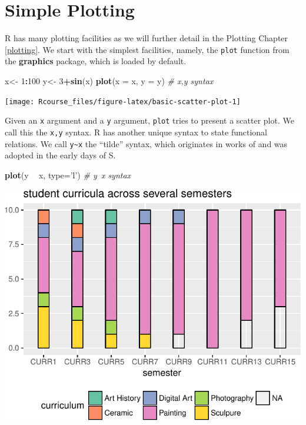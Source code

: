 \documentclass[]{book}
\newenvironment{Shaded}{\begin{snugshade}}{\end{snugshade}}
\newcommand{\KeywordTok}[1]{\textcolor[rgb]{0.13,0.29,0.53}{\textbf{#1}}}
\newcommand{\DataTypeTok}[1]{\textcolor[rgb]{0.13,0.29,0.53}{#1}}
\newcommand{\DecValTok}[1]{\textcolor[rgb]{0.00,0.00,0.81}{#1}}
\newcommand{\StringTok}[1]{\textcolor[rgb]{0.31,0.60,0.02}{#1}}
\newcommand{\CommentTok}[1]{\textcolor[rgb]{0.56,0.35,0.01}{\textit{#1}}}
\newcommand{\OperatorTok}[1]{\textcolor[rgb]{0.81,0.36,0.00}{\textbf{#1}}}
\newcommand{\NormalTok}[1]{#1}
\theoremstyle{definition}
\theoremstyle{definition}
\theoremstyle{definition}
\theoremstyle{remark}
\begin{document}
\section{Simple Plotting}\label{simple-plotting}

R has many plotting facilities as we will further detail in the Plotting
Chapter \ref{plotting}. We start with the simplest facilities, namely,
the \texttt{plot} function from the \textbf{graphics} package, which is
loaded by default.

\begin{Shaded}
\begin{Highlighting}[]
\NormalTok{x<-}\StringTok{ }\DecValTok{1}\OperatorTok{:}\DecValTok{100}
\NormalTok{y<-}\StringTok{ }\DecValTok{3}\OperatorTok{+}\KeywordTok{sin}\NormalTok{(x) }
\KeywordTok{plot}\NormalTok{(}\DataTypeTok{x =}\NormalTok{ x, }\DataTypeTok{y =}\NormalTok{ y) }\CommentTok{# x,y syntax                         }
\end{Highlighting}
\end{Shaded}

\texttt{[image: Rcourse\_files/figure-latex/basic-scatter-plot-1]}

Given an \texttt{x} argument and a \texttt{y} argument, \texttt{plot}
tries to present a scatter plot. We call this the \texttt{x,y} syntax. R
has another unique syntax to state functional relations. We call
\texttt{y\textasciitilde{}x} the ``tilde'' syntax, which originates in
works of \citet{wilkinson1973symbolic} and was adopted in the early days
of S.

\begin{Shaded}
\begin{Highlighting}[]
\KeywordTok{plot}\NormalTok{(y }\OperatorTok{~}\StringTok{ }\NormalTok{x, }\DataTypeTok{type=}\StringTok{'l'}\NormalTok{) }\CommentTok{# y~x syntax }
\end{Highlighting}
\end{Shaded}

\includegraphics[width=0.5\linewidth]{Rcourse_files/figure-latex/unnamed-chunk-32-1}
\end{document}
